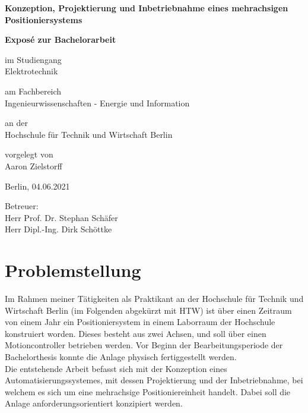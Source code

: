 \documentclass[12pt, a4paper, twoside]{article} %
\begin{document}
\begin{titlepage}
	\begin{center}
	\vspace*{0.2cm}
	
	\huge
	\textbf{Konzeption, Projektierung und Inbetriebnahme eines mehrachsigen Positioniersystems}
	
	\vspace*{2.0cm}
	\Large
	\textbf{Exposé zur Bachelorarbeit}
	
	\vspace*{1.2cm}
	\normalsize
	im Studiengang\\
	\Large
	Elektrotechnik
	
	\vspace*{0.9cm}
	\normalsize
	am Fachbereich\\
	\Large
	Ingenieurwissenschaften - Energie und Information
	
	\vspace*{0.9cm}
	\normalsize
	an der\\
	\Large
	Hochschule für Technik und Wirtschaft Berlin
	
	\vspace*{1.6cm}
	\normalsize
	vorgelegt von\\
	\Large
	Aaron Zielstorff
	
	\vspace*{0.7cm}
	\normalsize
	Berlin, 04.06.2021
	
	\vspace*{1.6cm}
	\normalsize
	Betreuer:\\
	Herr Prof. Dr. Stephan Schäfer\\
	Herr Dipl.-Ing. Dirk Schöttke
	
	\end{center}
\end{titlepage}


\setcounter{tocdepth}{2} %
\tableofcontents
\thispagestyle{empty}
\clearpage




\section{Problemstellung}
Im Rahmen meiner Tätigkeiten als Praktikant an der Hochschule für Technik und Wirtschaft Berlin (im Folgenden abgekürzt mit HTW) ist über einen Zeitraum von einem Jahr ein Positioniersystem in einem Laborraum der Hochschule konstruiert worden. Dieses besteht aus zwei Achsen, und soll über einen Motioncontroller betrieben werden. Vor Beginn der Bearbeitungsperiode der Bachelorthesis konnte die Anlage physisch fertiggestellt werden.\\
Die entstehende Arbeit befasst sich mit der Konzeption eines Automatisierungssystemes, mit dessen Projektierung und der Inbetriebnahme, bei welchem es sich um eine mehrachsige Positioniereinheit handelt. Dabei soll die Anlage anforderungsorientiert konzipiert werden.
\end{document}
